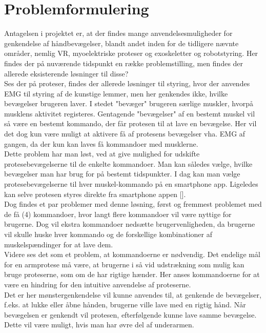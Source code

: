 \thispagestyle{fancy}
\chapter{Problemformulering}
\label{chp:problemformulering}

Antagelsen i projektet er, at der findes mange anvendelsesmuligheder for genkendelse af håndbevægelser, blandt andet inden for de tidligere nævnte områder, nemlig VR, myoelektriske proteser og exoskeletter og robotstyring. Her findes der på nuværende tidspunkt en række problemstilling, men findes der allerede eksisterende løsninger til disse?\\

Ses der på proteser, findes der allerede løsninger til styring, hvor der anvendes EMG til styring af de kunstige lemmer, men her genkendes ikke, hvilke bevægelser brugeren laver. I stedet "bevæger" brugeren særlige muskler, hvorpå musklens aktivitet registeres. Gentagende "bevægelser" af en bestemt muskel vil så være en bestemt kommando, der får protesen til at lave en bevægelse. Her vil det dog kun være muligt at aktivere få af protesens bevægelser vha. EMG af gangen, da der kun kan laves få kommandoer med musklerne. \\

Dette problem har man løst, ved at give mulighed for udskifte protesebevægelserne til de enkelte kommandoer. Man kan således vælge, hvilke bevægelser man har brug for på bestemt tidspunkter. I dag kan man vælge protesebevægelserne til hver muskel-kommando på en smartphone app. Ligeledes kan selve protesen styres direkte fra smartphone appen [\cite{touchbionics}].\\
Dog findes et par problemer med denne løsning, først og fremmest problemet med de få (4) kommandoer, hvor langt flere kommandoer vil være nyttige for brugerne. Dog vil ekstra kommandoer nedsætte brugervenligheden, da brugerne vil skulle huske hver kommando og de forskellige kombinationer af muskelspændinger for at lave dem.\\

Videre ses det som et problem, at kommandoerne er nødvendig. Det endelige mål for en armprotese må være, at brugerne i så vid udstrækning som mulig kan bruge proteserne, som om de har rigtige hænder. Her anses kommandoerne for at være en hindring for den intuitive anvendelse af proteserne.\\

Det er her mønstergenkendelse vil kunne anvendes til, at genkende de bevægelser, f.eks. at lukke eller åbne hånden, brugerne ville lave med en rigtig hånd. Når bevægelsen er genkendt vil protesen, efterfølgende kunne lave samme bevægelse. Dette vil være muligt, hvis man har øvre del af underarmen. \\

